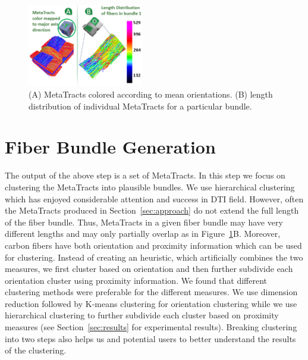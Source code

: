 

\begin{figure}[tb]
\centering
		\includegraphics[width=0.45\textwidth]{imagesMT2014/image5}
	\caption{(A) MetaTracts colored according to mean orientations. (B) length distribution of individual MetaTracts for a particular bundle.}
	\label{fig:length_distribution}
\end{figure}


\section {Fiber Bundle Generation}
\label{subsec:fiber-bundles}
The output of the above step is a set of MetaTracts. In this step we focus on clustering the MetaTracts into plausible bundles. We use hierarchical clustering which has enjoyed considerable attention and success in DTI field. However, often the MetaTracts produced in Section~\ref{sec:approach} do not extend the full length of the fiber bundle. Thus, MetaTracts in a given fiber bundle may have very different lengths and may only partially overlap as in Figure~\ref{fig:length_distribution}B. Moreover, carbon fibers have both orientation and proximity information which can be used for clustering. Instead of creating an heuristic, which artificially combines the two measures, we first cluster based on orientation and then further subdivide each orientation cluster using proximity information. We found that different clustering methods were preferable for the different measures. We use dimension reduction followed by K-means clustering for orientation clustering while we use hierarchical clustering to further subdivide each cluster based on proximity measures (see Section~\ref{sec:results} for experimental results). Breaking clustering into two steps also helps us and potential users to better understand the results of the clustering.

